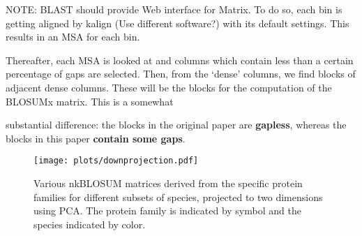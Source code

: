 \documentclass{article}
\begin{document}
\begin{multicols}{2}
NOTE: BLAST should provide Web interface for Matrix.
To do so, each bin is getting aligned by kalign (Use different software?) with
its default settings. This results in an MSA for each bin.

Thereafter, each MSA is looked at and columns which contain less than a certain
percentage of gaps are selected. Then, from the `dense' columns, we find blocks
of adjacent dense columns. These will be the blocks for the computation of the
BLOSUMx matrix. This is a somewhat

substantial difference: the blocks in the original paper are \textbf{gapless},
whereas the blocks in this paper \textbf{contain some gaps}.

\end{multicols}

\begin{figure}
	\centering
\texttt{[image: plots/downprojection.pdf]}
	\caption{Various nkBLOSUM matrices derived from the specific protein families for different subsets of species, projected to two dimensions using PCA. The protein family is indicated by symbol and the species indicated by color.}
\end{figure}


\printbibliography
\end{document}
